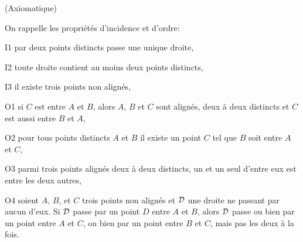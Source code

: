 \documentclass[a4paper,12pt,reqno]{amsart}
\begin{document}
\begin{exo} (Axiomatique)

  On rappelle les propriétés d'incidence et d'ordre:\\[-1.7\baselineskip]
  \begin{multicols}{2}\small
    \begin{axioms}[leftmargin=3.5em]
      \item[I1] par deux points distincts passe une unique droite,
      \item[I2] toute droite contient au moins deux points distincts,
      \item[I3] il existe trois points non alignés,
      \item[O1] si $C$ est entre $A$ et $B$, alors $A$, $B$ et $C$ sont alignés, deux à deux distincts et $C$ est aussi entre $B$ et $A$,
      \item[O2] pour tous points distincts $A$ et $B$ il existe un point $C$ tel que $B$ soit entre $A$ et $C$,
      \item[O3] parmi trois points alignés deux à deux distincts, un et un seul d'entre eux est entre les deux autres,
      \item[O4] soient $A$, $B$, et $C$ trois points non alignés et $\mathcal{D}$ une droite ne passant par aucun d'eux. Si $\mathcal{D}$ passe par un point $D$ entre $A$ et $B$, alors $\mathcal{D}$ passe ou bien par un point entre $A$ et $C$, ou bien par un point entre $B$ et $C$, mais pas les deux à la fois.
    \end{axioms}
  \end{multicols}\vspace{7pt}
\end{exo}
\end{document}
